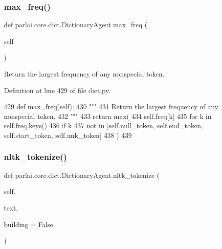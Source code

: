 \subsubsection{\texorpdfstring{max\+\_\+freq()}{max\_freq()}}
{\footnotesize\ttfamily def parlai.\+core.\+dict.\+Dictionary\+Agent.\+max\+\_\+freq (\begin{DoxyParamCaption}\item[{}]{self }\end{DoxyParamCaption})}

\begin{DoxyVerb}Return the largest frequency of any nonspecial token.
\end{DoxyVerb}
 

Definition at line 429 of file dict.\+py.


\begin{DoxyCode}
429     \textcolor{keyword}{def }max\_freq(self):
430         \textcolor{stringliteral}{"""}
431 \textcolor{stringliteral}{        Return the largest frequency of any nonspecial token.}
432 \textcolor{stringliteral}{        """}
433         \textcolor{keywordflow}{return} max(
434             self.freq[k]
435             \textcolor{keywordflow}{for} k \textcolor{keywordflow}{in} self.freq.keys()
436             \textcolor{keywordflow}{if} k
437             \textcolor{keywordflow}{not} \textcolor{keywordflow}{in} [self.null\_token, self.end\_token, self.start\_token, self.unk\_token]
438         )
439 
\end{DoxyCode}
\mbox{\label{classparlai_1_1core_1_1dict_1_1DictionaryAgent_a73fe72e257ace6e8debf2c41995f8390}} 
\subsubsection{\texorpdfstring{nltk\+\_\+tokenize()}{nltk\_tokenize()}}
{\footnotesize\ttfamily def parlai.\+core.\+dict.\+Dictionary\+Agent.\+nltk\+\_\+tokenize (\begin{DoxyParamCaption}\item[{}]{self,  }\item[{}]{text,  }\item[{}]{building = {\ttfamily False} }\end{DoxyParamCaption})}

